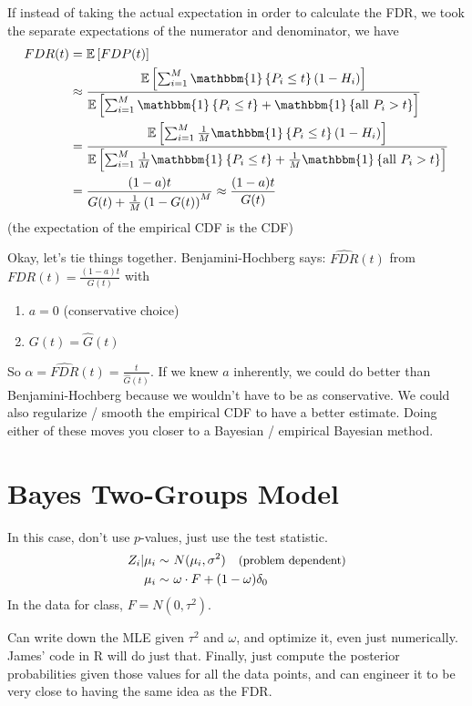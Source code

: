\documentclass{article}
\newcommand{\indicator}[1]{ \ensuremath{ \mathbbm{1}\left\{ #1 \right\} }   }
\begin{document}
If instead of taking the actual expectation in order to calculate the FDR, we took the separate expectations of the numerator and denominator, we have
\begin{align*}
FDR(t)&= \mathbb{E}\left[FDP(t)\right]\\
&\approx \frac{
\mathbb{E}\left[\sum_{i=1}^M \indicator{P_i\leq t}\left( 1-H_i \right)\right]}{
\mathbb{E}\left[\sum_{i=1}^M \indicator{P_i\leq t } + \indicator{  \textrm{all~} P_i > t}\right]
}\\
&= \frac{
\mathbb{E}\left[\sum_{i=1}^M \frac{1}{M}\indicator{P_i\leq t}\left( 1-H_i \right)\right]}{
\mathbb{E}\left[\sum_{i=1}^M \frac{1}{M}\indicator{P_i\leq t } + \frac{1}{M}\indicator{  \textrm{all~} P_i > t}\right]
}\\
&= \frac{(1-a)t}{G(t)+\frac{1}{M}\left(1-G(t)\right)^M} \approx \frac{(1-a)t}{G(t)}
\end{align*}
(the expectation of the empirical CDF is the CDF)

Okay, let's tie things together. Benjamini-Hochberg says: $\hat{FDR}(t)$ from $FDR(t)=\frac{(1-a)t}{G(t)}$ with
\begin{enumerate}[(1)]
\item $a=0$ (conservative choice)
\item $G(t)=\hat{G}(t)$
\end{enumerate}

So $\alpha=\hat{FDR}(t)=\frac{t}{\hat{G}(t)}$. If we knew $a$ inherently, we could do better than Benjamini-Hochberg 
because we wouldn't have to be as conservative. We could also regularize / smooth the empirical CDF to have a
better estimate. Doing either of these moves you closer to a Bayesian / empirical Bayesian method.

\section{Bayes Two-Groups Model}
In this case, don't use $p$-values, just use the test statistic.
\begin{align*}
Z_i | \mu_i \sim~& N(\mu_i, \sigma^2)~~~{\small \textrm{(problem dependent)}}\\
\mu_i \sim~&\omega\cdot F + (1-\omega)\delta_0
\end{align*}
In the data for class, $F=N(0,\tau^2)$.

Can write down the MLE given $\tau^2$ and $\omega$, and optimize it, even just numerically. James' code in R
will do just that. Finally, just compute the posterior probabilities given those values for all the data points, and can
engineer it to be very close to having the same idea as the FDR.


\printbibliography
\end{document}
